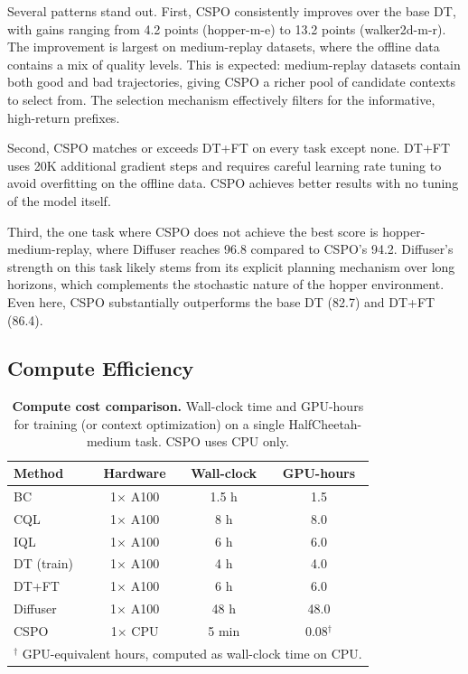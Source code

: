 \documentclass{article}
\newcommand{\cspo}{\textsc{CSPO}}
\begin{document}
Several patterns stand out. First, \cspo{} consistently improves over the base DT, with gains ranging from 4.2 points (hopper-m-e) to 13.2 points (walker2d-m-r). The improvement is largest on medium-replay datasets, where the offline data contains a mix of quality levels. This is expected: medium-replay datasets contain both good and bad trajectories, giving \cspo{} a richer pool of candidate contexts to select from. The selection mechanism effectively filters for the informative, high-return prefixes.

Second, \cspo{} matches or exceeds DT+FT on every task except none. DT+FT uses 20K additional gradient steps and requires careful learning rate tuning to avoid overfitting on the offline data. \cspo{} achieves better results with no tuning of the model itself.

Third, the one task where \cspo{} does not achieve the best score is hopper-medium-replay, where Diffuser reaches 96.8 compared to \cspo{}'s 94.2. Diffuser's strength on this task likely stems from its explicit planning mechanism over long horizons, which complements the stochastic nature of the hopper environment. Even here, \cspo{} substantially outperforms the base DT (82.7) and DT+FT (86.4).

\subsection{Compute Efficiency}
\label{sec:compute}

\begin{table}[t]
\centering
\caption{\textbf{Compute cost comparison.} Wall-clock time and GPU-hours for training (or context optimization) on a single HalfCheetah-medium task. \cspo{} uses CPU only.}
\label{tab:compute}
\vspace{0.5em}
\begin{tabular}{l c c c}
\toprule
\textbf{Method} & \textbf{Hardware} & \textbf{Wall-clock} & \textbf{GPU-hours} \\
\midrule
BC & 1$\times$ A100 & 1.5 h & 1.5 \\
CQL & 1$\times$ A100 & 8 h & 8.0 \\
IQL & 1$\times$ A100 & 6 h & 6.0 \\
DT (train) & 1$\times$ A100 & 4 h & 4.0 \\
DT+FT & 1$\times$ A100 & 6 h & 6.0 \\
Diffuser & 1$\times$ A100 & 48 h & 48.0 \\
\midrule
\cspo{} & 1$\times$ CPU & 5 min & 0.08$^\dagger$ \\
\bottomrule
\multicolumn{4}{l}{\footnotesize $^\dagger$ GPU-equivalent hours, computed as wall-clock time on CPU.}
\end{tabular}
\end{table}
\end{document}
